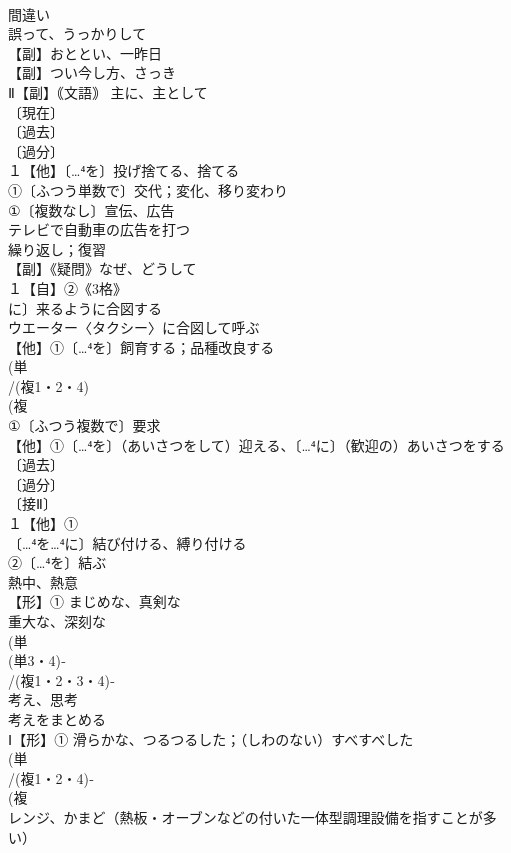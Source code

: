 \documentclass[8pt]{extreport}
\begin{document}
\begin{CJK}{UTF8}{min}
\\	間違い 
\\	誤って、うっかりして
\\	【副】おととい、一昨日
\\	【副】つい今し方、さっき
\\	Ⅱ【副】｟文語｠ 主に、主として 
\\	〔現在〕
\\	〔過去〕
\\	〔過分〕
\\	１【他】〔…⁴を〕投げ捨てる、捨てる 
\\	①〔ふつう単数で〕交代；変化、移り変わり 
\\	①〔複数なし〕宣伝、広告 
\\	テレビで自動車の広告を打つ
\\	繰り返し；復習 
\\	【副】《疑問》なぜ、どうして 
\\	１【自】②《3格》 
\\	に〕来るように合図する 
\\	ウエーター〈タクシー〉に合図して呼ぶ 
\\	【他】①〔…⁴を〕飼育する；品種改良する
\\	(単
\\	/(複1・2・4)
\\	(複
\\	①〔ふつう複数で〕要求 
\\	【他】①〔…⁴を〕（あいさつをして）迎える、〔…⁴に〕（歓迎の）あいさつをする 
\\	〔過去〕
\\	〔過分〕
\\	〔接Ⅱ〕
\\	１【他】①
\\	〔…⁴を…⁴に〕結び付ける、縛り付ける 
\\	②〔…⁴を〕結ぶ
\\	熱中、熱意
\\	【形】① まじめな、真剣な 
\\	重大な、深刻な 
\\	(単
\\	(単3・4)‐
\\	/(複1・2・3・4)‐
\\	考え、思考 
\\	考えをまとめる
\\	Ⅰ【形】① 滑らかな、つるつるした；（しわのない）すべすべした 
\\	(単
\\	/(複1・2・4)‐
\\	(複
\\	レンジ、かまど（熱板・オーブンなどの付いた一体型調理設備を指すことが多い） 

\end{CJK}
\end{document}
